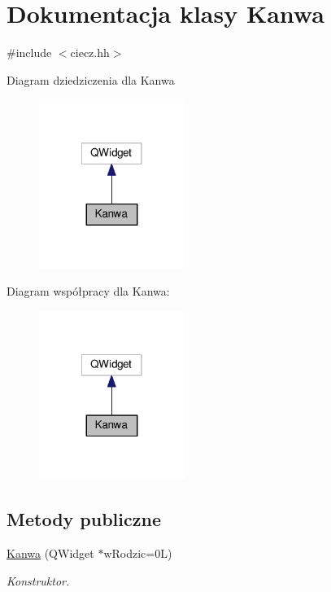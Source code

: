 \hypertarget{class_kanwa}{\section{Dokumentacja klasy Kanwa}
\label{class_kanwa}
}


{\ttfamily \#include $<$ciecz.\-hh$>$}



Diagram dziedziczenia dla Kanwa
\nopagebreak
\begin{figure}[H]
\begin{center}
\leavevmode
\includegraphics[width=134pt]{class_kanwa__inherit__graph}
\end{center}
\end{figure}


Diagram współpracy dla Kanwa\-:
\nopagebreak
\begin{figure}[H]
\begin{center}
\leavevmode
\includegraphics[width=134pt]{class_kanwa__coll__graph}
\end{center}
\end{figure}
\subsection*{Metody publiczne}
\begin{DoxyCompactItemize}
\item 
\hyperlink{class_kanwa_a6a634418b76abed84199abe8d2680c91}{Kanwa} (Q\-Widget $\ast$w\-Rodzic=0\-L)
\begin{DoxyCompactList}\small\item\em Konstruktor. \end{DoxyCompactList}\end{DoxyCompactItemize}


